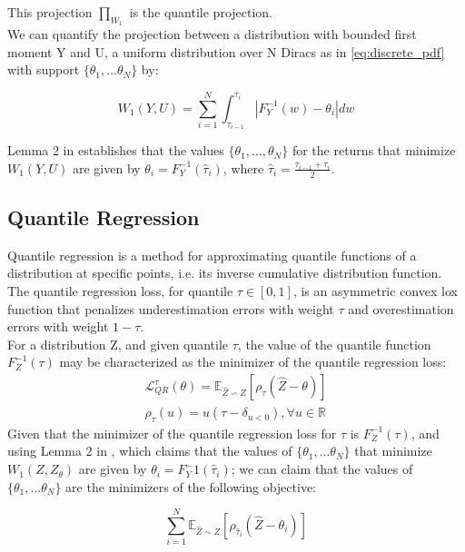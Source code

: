 This projection $\prod_ {W_1}$ is the quantile projection.\\
We can quantify the projection between a distribution with bounded first moment Y and U, a uniform distribution
over N Diracs as in \eqref{eq:discrete_pdf} with support $\{\theta_1, ... \theta_N\}$ by:

\begin{equation}
    W_1(Y,U)= \sum_{i=1}^{N}\int_{\tau_{i-1}}^{\tau_i} |   F_Y^{-1}(w)-\theta_i   |dw
\end{equation}

Lemma 2 in \cite{Dabney2018a} establishes that the values $\{\theta_1, ... ,\theta_N\}$ for the returns  that minimize 
$W_1(Y,U)$ are given by $\theta_i = F_Y^{-1}(\hat\tau_i)$, where $\hat\tau_i=\frac{\tau_{i-1}+\tau_i}{2}$.

\subsection{Quantile Regression}
Quantile regression is a method for approximating quantile functions of a distribution at specific points, i.e. its inverse
cumulative distribution function.
The quantile regression loss, for quantile $\tau \in [0,1]$, is an asymmetric convex lox function
that penalizes underestimation errors with weight $\tau$ and overestimation errors
with weight $1-\tau$. \\
For a distribution Z, and given quantile $\tau$, the value of the quantile function $F_Z^{-1}(\tau)$
may be characterized as the minimizer of the quantile regression loss:
\begin{align}
    \mathcal{L}_{QR}^{\tau}(\theta)=\mathbb E_{\hat{Z}\backsim Z}[\rho_\tau(\hat{Z}-\theta) ] \label{eq:quantile_loss}\\
    \rho_\tau(u)=u(\tau - \delta_{u<0}) , \forall u \in \mathbb{R} \nonumber
\end{align}
Given that the minimizer of the quantile regression loss for $\tau$ is $F_Z^{-1}(\tau)$, and using Lemma 2 in \cite{Dabney2018a},
which claims that the values of $\{\theta_1, ... \theta_N\}$ that minimize
 $W_1(Z,Z_\theta)$ are given by $\theta_i = F_Y^-1(\hat\tau_i)$; we can claim that
 the values of $\{\theta_1, ... \theta_N\}$ are the minimizers of the following objective:

\begin{equation}
    \sum_{i=1}^{N} \mathbb E_{\hat{Z} \sim Z} [ \rho_{\hat\tau_i}(\hat{Z}-\theta_i)]
\end{equation}

